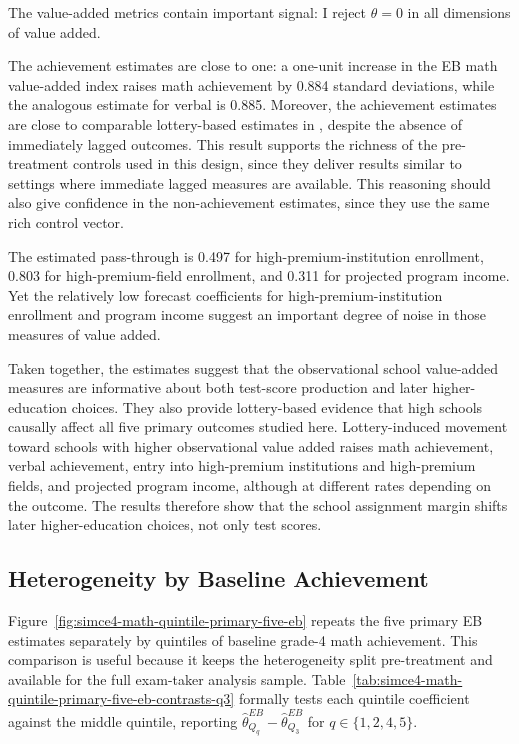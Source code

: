 \documentclass[a4paper, article, english, oneside, unknownkeysallowed, 12pt]{memoir}
\begin{document}
The value-added metrics contain important signal: I reject $\theta = 0$ in all dimensions of value added.

The achievement estimates are close to one: a one-unit increase in the EB math value-added index raises math achievement by 0.884 standard deviations, while the analogous estimate for verbal is 0.885.
Moreover, the achievement estimates are close to comparable lottery-based estimates in \textcite{angrist_leveraging_2017}, despite the absence of immediately lagged outcomes.
This result supports the richness of the pre-treatment controls used in this design, since they deliver results similar to settings where immediate lagged measures are available.
This reasoning should also give confidence in the non-achievement estimates, since they use the same rich control vector.

The estimated pass-through is 0.497 for high-premium-institution enrollment, 0.803 for high-premium-field enrollment, and 0.311 for projected program income.
Yet the relatively low forecast coefficients for high-premium-institution enrollment and program income suggest an important degree of noise in those measures of value added.

Taken together, the estimates suggest that the observational school value-added measures are informative about both test-score production and later higher-education choices.
They also provide lottery-based evidence that high schools causally affect all five primary outcomes studied here.
Lottery-induced movement toward schools with higher observational value added raises math achievement, verbal achievement, entry into high-premium institutions and high-premium fields, and projected program income, although at different rates depending on the outcome.
The results therefore show that the school assignment margin shifts later higher-education choices, not only test scores.




\subsection{Heterogeneity by Baseline Achievement}

Figure~\ref{fig:simce4-math-quintile-primary-five-eb} repeats the five primary EB estimates separately by quintiles of baseline grade-4 math achievement.
This comparison is useful because it keeps the heterogeneity split pre-treatment and available for the full exam-taker analysis sample.
Table~\ref{tab:simce4-math-quintile-primary-five-eb-contrasts-q3} formally tests each quintile coefficient against the middle quintile, reporting $\widehat{\theta}^{EB}_{Q_q}-\widehat{\theta}^{EB}_{Q_3}$ for $q\in\{1,2,4,5\}$.
\end{document}
